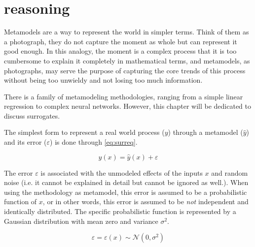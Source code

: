 \documentclass[../msc-thesis.tex]{subfiles}
\begin{document}
\chapter{\kriging reasoning}

Metamodels are a way to represent the world in simpler terms. Think of them as 
a photograph, they do not capture the moment as whole but can represent it 
good enough. In this analogy, the moment is a complex process that it is too 
cumbersome to explain it completely in mathematical terms, and metamodels, as 
photographs, may serve the purpose of capturing the core trends of this 
process without being too unwieldy and not losing too much information.

There is a family of metamodeling methodologies, ranging from a simple linear 
regression to complex neural networks. However, this chapter will be dedicated 
to discuss \kriging surrogates.

The simplest form to represent a real world process ($y$) through a metamodel 
($\hat{y}$) and its error ($\varepsilon$) is done through \autoref{eq:surreq}.

\begin{equation}
    y(x) = \hat{y}(x) + \varepsilon
    \label{eq:surreq}
\end{equation}

The error $\varepsilon$ is associated with the unmodeled effects of the inputs 
$x$ and random noise (i.e. it cannot be explained in detail but cannot be 
ignored as well.). When using the \kriging methodology as metamodel, this 
error is assumed to be a probabilistic function of $x$, or in other words, 
this error is assumed to be \textit{not} independent and identically 
distributed. The specific probabilistic function is represented by a Gaussian 
distribution with mean zero and variance $\sigma^2$.

\begin{equation}
    \varepsilon = \varepsilon(x) \sim \mathcal{N}(0, \sigma^2)
    \label{eq:krgdist}
\end{equation}

%     
\end{document}
